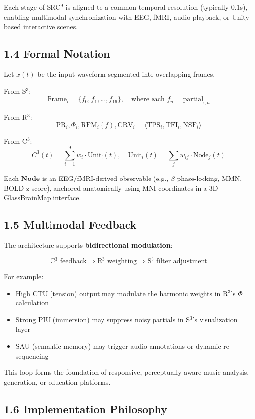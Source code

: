 Each stage of SRC$^{9}$ is aligned to a common temporal resolution (typically 0.1s), enabling multimodal synchronization with EEG, fMRI, audio playback, or Unity-based interactive scenes.

\subsection*{1.4 Formal Notation}

Let $x(t)$ be the input waveform segmented into overlapping frames.

From S$^{3}$:
\[
\text{Frame}_i = \{f_0, f_1, ..., f_{16}\}, \quad \text{where each } f_n = \text{partial}_{i,n}
\]

From R$^{3}$:
\[
\text{PR}_i, \Phi_i, \text{RFM}_i(f), \text{CRV}_i = \langle \text{TPS}_i, \text{TFI}_i, \text{NSF}_i \rangle
\]

From C$^{3}$:
\[
C^{3}(t) = \sum_{i=1}^{9} w_i \cdot \text{Unit}_i(t), \quad \text{Unit}_i(t) = \sum_j w_{ij} \cdot \text{Node}_j(t)
\]

Each \textbf{Node} is an EEG/fMRI-derived observable (e.g., $\beta$ phase-locking, MMN, BOLD z-score), anchored anatomically using MNI coordinates in a 3D GlassBrainMap interface.

\subsection*{1.5 Multimodal Feedback}

The architecture supports \textbf{bidirectional modulation}:

\[
\text{C$^{3}$ feedback} \Rightarrow \text{R$^{3}$ weighting} \Rightarrow \text{S$^{3}$ filter adjustment}
\]

For example:

\begin{itemize}
    \item High CTU (tension) output may modulate the harmonic weights in R$^{3}$'s $\Phi$ calculation
    \item Strong PIU (immersion) may suppress noisy partials in S$^{3}$’s visualization layer
    \item SAU (semantic memory) may trigger audio annotations or dynamic re-sequencing
\end{itemize}

This loop forms the foundation of responsive, perceptually aware music analysis, generation, or education platforms.

\subsection*{1.6 Implementation Philosophy}

